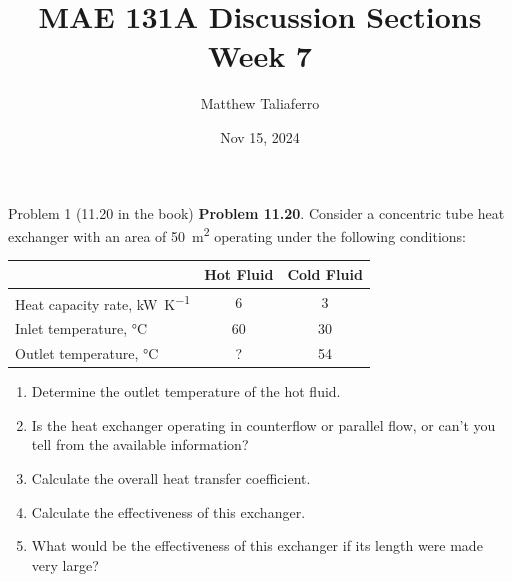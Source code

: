 \documentclass[9pt, aspectratio=169, handout]{beamer}
\title{MAE 131A Discussion Sections\\ Week 7}
\author{Matthew Taliaferro}
\institute[UCLA MAE]{Mechanical and Aerospace Engineering Department\\
    University of California, Los Angeles}
\date{Nov 15, 2024}
\begin{document}
\begin{frame}
    \titlepage
\end{frame}

\begin{frame}{Problem 1 (11.20 in the book)}
    \textbf{Problem 11.20}.
        Consider a concentric tube heat exchanger with an area of \SI{50}{\square\meter} operating under the following conditions:

    \begin{center}
        \begin{tabular}{lcc}
            \toprule
            ~ & Hot Fluid & Cold Fluid \\
            \midrule
            Heat capacity rate, \si{\kilo\watt\per\kelvin} & 6 & 3 \\
            Inlet temperature, \si{\celsius} & 60 & 30 \\
            Outlet temperature, \si{\celsius} & ? & 54 \\
            \bottomrule
        \end{tabular}
    \end{center}

    
    \begin{enumerate}
        \item Determine the outlet temperature of the hot fluid.
        \item Is the heat exchanger operating in counterflow or parallel flow, or can't you tell from the available information?
        \item Calculate the overall heat transfer coefficient.
        \item Calculate the effectiveness of this exchanger.
        \item What would be the effectiveness of this exchanger if its length were made very large?
    \end{enumerate}
\end{frame}
\end{document}
